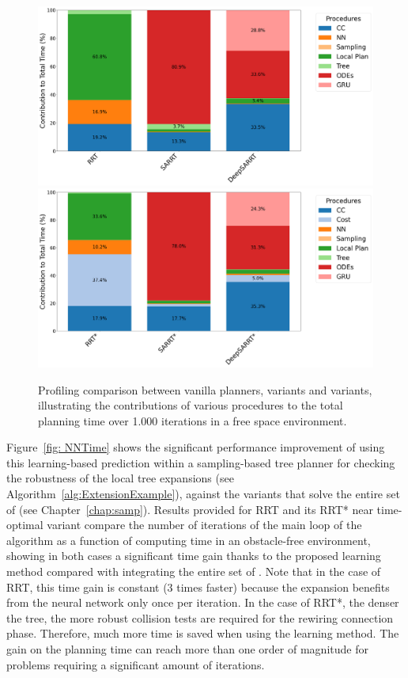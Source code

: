\begin{figure} [htp]
    \centering
    \includegraphics[width=0.9\linewidth]{figures/robust_accurate/profiling_rrt.png}%
    \\
    \includegraphics[width=0.9\linewidth]{figures/robust_accurate/profiling_rrtstar.png}%
    \caption{Profiling comparison between vanilla planners,  variants and  variants, illustrating the contributions of various procedures to the total planning time over 1.000 iterations in a free space environment.}%
    \label{fig:NNProfiling}%
\end{figure}

Figure~\ref{fig: NNTime} shows the significant performance improvement of using this learning-based prediction within a sampling-based tree planner for checking the robustness of the local tree expansions (see Algorithm~\ref{alg:ExtensionExample}), against the  variants that solve the entire set of  (see Chapter~\ref{chap:samp}).  
Results provided for RRT and its RRT* near time-optimal variant compare the number of iterations of the main loop of the algorithm as a function of computing time in an obstacle-free environment, showing in both cases a significant time gain thanks to the proposed learning method compared with integrating the entire set of .
Note that in the case of RRT, this time gain is constant ($3$ times faster) because the expansion benefits from the neural network only once per iteration.
In the case of RRT*, the denser the tree, the more robust collision tests are required for the rewiring connection phase. 
Therefore, much more time is saved when using the learning method. 
The gain on the planning time can reach more than one order of magnitude for problems requiring a significant amount of iterations.

